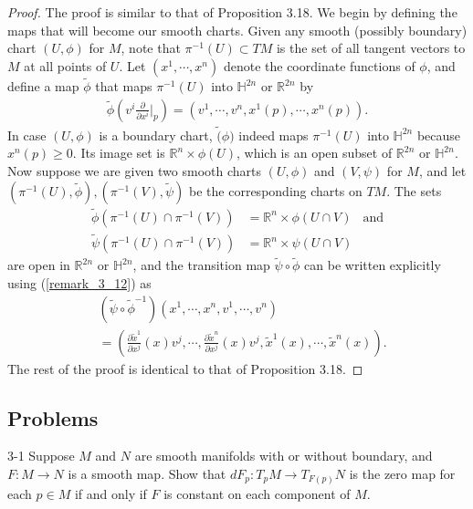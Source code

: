 \begin{proof}
  The proof is similar to that of Proposition 3.18.
  We begin by defining the maps that will become our smooth charts.
  Given any smooth (possibly boundary) chart $(U, \phi)$ for $M$, note that $\pi^{-1}(U) \subset TM$ is the set of all tangent vectors to $M$ at all points of $U$.
  Let $(x^1, \cdots, x^n)$ denote the coordinate functions of $\phi$, and define a map $\tilde{\phi}$ that maps $\pi^{-1}(U)$ into $\mathbb{H}^{2n}$ or $\mathbb{R}^{2n}$ by
  \begin{align*}
    \tilde{\phi}(v^i\frac{\partial}{\partial x^i}\Big\vert_p) = (v^1, \cdots, v^n, x^1(p), \cdots, x^n(p)).
  \end{align*}
  In case $(U, \phi)$ is a boundary chart, $\tilde(\phi)$ indeed maps $\pi^{-1}(U)$ into $\mathbb{H}^{2n}$ because $x^n(p) \geq 0$.
  Its image set is $\mathbb{R}^n \times \phi(U)$, which is an open subset of $\mathbb{R}^{2n}$ or $\mathbb{H}^{2n}$.
  Now suppose we are given two smooth charts $(U, \phi)$ and $(V, \psi)$ for $M$, and let $(\pi^{-1}(U), \tilde{\phi}), (\pi^{-1}(V), \tilde{\psi})$ be the corresponding charts on $TM$. The sets
  \begin{align*}
    \tilde{\phi}(\pi^{-1}(U) \cap \pi^{-1}(V)) &= \mathbb{R}^n \times \phi(U \cap V) & \text{and}\\
    \tilde{\psi}(\pi^{-1}(U) \cap \pi^{-1}(V)) &= \mathbb{R}^n \times \psi(U \cap V)
  \end{align*}
  are open in $\mathbb{R}^{2n}$ or $\mathbb{H}^{2n}$, and the transition map $\tilde{\psi} \circ \tilde{\phi}$ can be written explicitly using (\ref{remark_3_12}) as
  \begin{align*}
    &(\tilde{\psi} \circ \tilde{\phi}^{-1})(x^1, \cdots, x^n, v^1, \cdots, v^n) \\
      &= (\frac{\partial \tilde{x}^1}{\partial x^j}(x)v^j, \cdots, \frac{\partial \tilde{x}^n}{\partial x^j}(x)v^j, \tilde{x}^1(x), \cdots, \tilde{x}^n(x)).
  \end{align*}
  The rest of the proof is identical to that of Proposition 3.18.
\end{proof}

\subsection{Problems}

\begin{customprob}{3-1}
  Suppose $M$ and $N$ are smooth manifolds with or without boundary, and $F: M \rightarrow N$ is a smooth map.
  Show that $dF_p: T_pM \rightarrow T_{F(p)}N$ is the zero map for each $p \in M$ if and only if $F$ is constant on each component of $M$.
\end{customprob}


